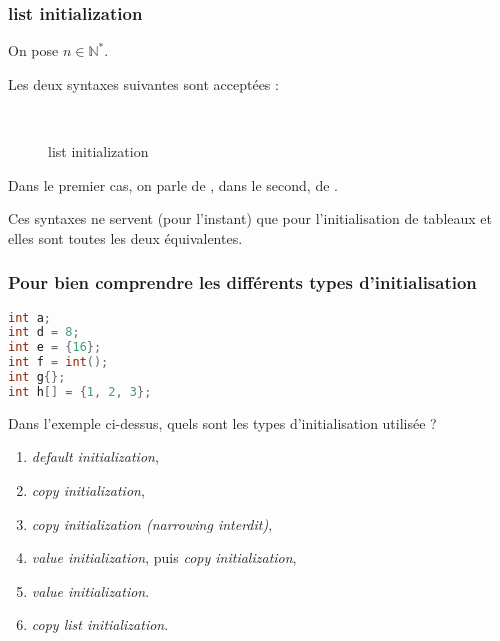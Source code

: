\documentclass{cppcourses}
\begin{document}
\begin{frame}

\frametitle{list initialization}

On pose \( n \in \mathbb{N}^* \).

Les deux syntaxes suivantes sont acceptées :

\begin{figure}
\mykeyword{\textcolor{red}{<type>} \textcolor{blue}{<identifiant>}\{\textcolor{teal}{<argument1>}, \dots, \textcolor{teal}{<argument\( n \)>}\};} \\
\mykeyword{\textcolor{red}{<type>} \textcolor{blue}{<identifiant>} = \{\textcolor{teal}{<argument1>}, \dots, \textcolor{teal}{<argument\( n \)>}\};}
\caption{list initialization}
\end{figure}

Dans le premier cas, on parle de , dans le second, de .

Ces syntaxes ne servent (pour l'instant) que pour l'initialisation de tableaux et elles sont toutes les deux équivalentes.

\end{frame}

\begin{frame}[fragile]

\frametitle{Pour bien comprendre les différents types d'initialisation}

\begin{example}

\begin{lstlisting}[language = c++]
int a;
int d = 8;
int e = {16};
int f = int();
int g{};
int h[] = {1, 2, 3};
\end{lstlisting}

Dans l'exemple ci-dessus, quels sont les types d'initialisation utilisée ?

\begin{enumerate}
    \myanswerize

    \item<visible@2-> \emph{default initialization},
    \item<visible@3-> \emph{copy initialization},
    \item<visible@4-> \emph{copy initialization (\emph{narrowing} interdit)},
    \item<visible@5-> \emph{value initialization}, puis \emph{copy initialization},
    \item<visible@6-> \emph{value initialization}.
    \item<visible@7-> \emph{copy list initialization}.
\end{enumerate}

\end{example}

\end{frame}
\end{document}
